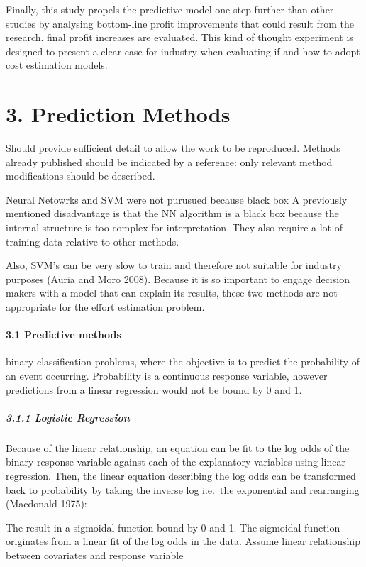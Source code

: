 \documentclass[]{elsarticle} %
\begin{document}
Finally, this study propels the predictive model one step further than
other studies by analysing bottom-line profit improvements that could
result from the research. final profit increases are evaluated. This
kind of thought experiment is designed to present a clear case for
industry when evaluating if and how to adopt cost estimation models.

\section{3. Prediction Methods}\label{prediction-methods}

Should provide sufficient detail to allow the work to be reproduced.
Methods already published should be indicated by a reference: only
relevant method modifications should be described.

Neural Netowrks and SVM were not purusued because black box A previously
mentioned disadvantage is that the NN algorithm is a black box because
the internal structure is too complex for interpretation. They also
require a lot of training data relative to other methods.

Also, SVM's can be very slow to train and therefore not suitable for
industry purposes (Auria and Moro 2008). Because it is so important to
engage decision makers with a model that can explain its results, these
two methods are not appropriate for the effort estimation problem.

\paragraph{3.1 Predictive methods}\label{predictive-methods}

binary classification problems, where the objective is to predict the
probability of an event occurring. Probability is a continuous response
variable, however predictions from a linear regression would not be
bound by 0 and 1.

\subparagraph{3.1.1 Logistic Regression}\label{logistic-regression}

Because of the linear relationship, an equation can be fit to the log
odds of the binary response variable against each of the explanatory
variables using linear regression. Then, the linear equation describing
the log odds can be transformed back to probability by taking the
inverse log i.e.~the exponential and rearranging (Macdonald 1975):

The result in a sigmoidal function bound by 0 and 1. The sigmoidal
function originates from a linear fit of the log odds in the data.
Assume linear relationship between covariates and response variable
\end{document}
